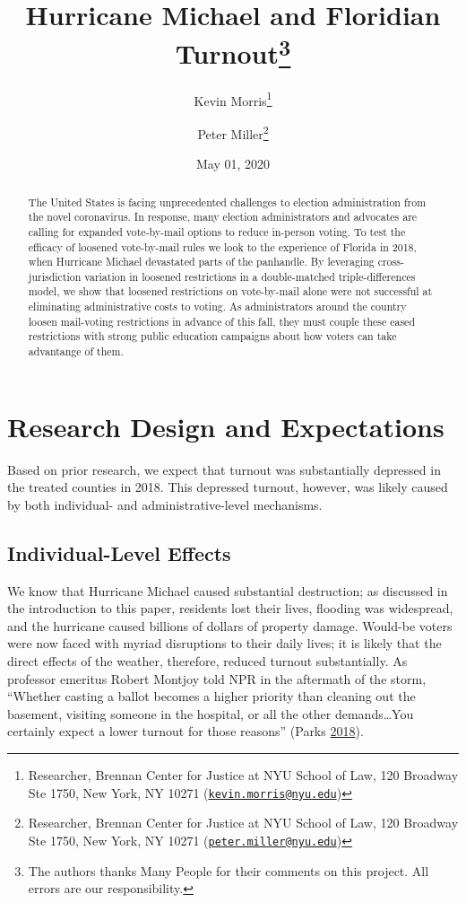 \documentclass[
  12pt,
]{article}
\title{Hurricane Michael and Floridian Turnout\thanks{The authors thanks Many People for their comments on this project. All errors are our responsibility.}}
\author{Kevin Morris\footnote{Researcher, Brennan Center for Justice at NYU School of Law, 120 Broadway Ste 1750, New York, NY 10271 (\href{mailto:kevin.morris@nyu.edu}{\nolinkurl{kevin.morris@nyu.edu}})} \and Peter Miller\footnote{Researcher, Brennan Center for Justice at NYU School of Law, 120 Broadway Ste 1750, New York, NY 10271 (\href{mailto:peter.miller@nyu.edu}{\nolinkurl{peter.miller@nyu.edu}})}}
\date{May 01, 2020}
\begin{document}
\maketitle
\begin{abstract}
The United States is facing unprecedented challenges to election administration from the novel coronavirus. In response, many election administrators and advocates are calling for expanded vote-by-mail options to reduce in-person voting. To test the efficacy of loosened vote-by-mail rules we look to the experience of Florida in 2018, when Hurricane Michael devastated parts of the panhandle. By leveraging cross-jurisdiction variation in loosened restrictions in a double-matched triple-differences model, we show that loosened restrictions on vote-by-mail alone were not successful at eliminating administrative costs to voting. As administrators around the country loosen mail-voting restrictions in advance of this fall, they must couple these eased restrictions with strong public education campaigns about how voters can take advantange of them.
\end{abstract}

\pagebreak

\doublespacing

\hypertarget{research-design-and-expectations}{%
\section*{Research Design and Expectations}\label{research-design-and-expectations}}

Based on prior research, we expect that turnout was substantially depressed in the treated counties in 2018. This depressed turnout, however, was likely caused by both individual- and administrative-level mechanisms.

\hypertarget{individual-level-effects}{%
\subsection*{Individual-Level Effects}\label{individual-level-effects}}

We know that Hurricane Michael caused substantial destruction; as discussed in the introduction to this paper, residents lost their lives, flooding was widespread, and the hurricane caused billions of dollars of property damage. Would-be voters were now faced with myriad disruptions to their daily lives; it is likely that the direct effects of the weather, therefore, reduced turnout substantially. As professor emeritus Robert Montjoy told NPR in the aftermath of the storm, ``Whether casting a ballot becomes a higher priority than cleaning out the basement, visiting someone in the hospital, or all the other demands\ldots You certainly expect a lower turnout for those reasons'' (Parks \protect\hyperlink{ref-Parks2018}{2018}).
\end{document}

